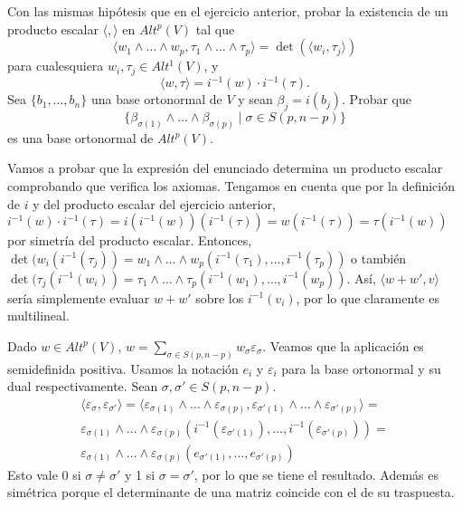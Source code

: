 \documentclass[twoside]{article}
\begin{document}
\begin{ejercicio}{2.5}
Con las mismas hipótesis que en el ejercicio anterior, probar la existencia de un producto escalar $\langle,\rangle$ en $Alt^p(V)$ tal que
$$\langle w_1\land\dots\land w_p,\tau_1\land\dots\land\tau_p\rangle=\det(\langle w_i,\tau_j\rangle)$$
para cualesquiera $w_i,\tau_j\in Alt^1(V)$, y 
$$\langle w,\tau\rangle=i^{-1}(w)\cdot i^{-1}(\tau).$$
Sea $\{b_1,\dots, b_n\}$ una base ortonormal de $V$ y sean $\beta_j=i(b_j)$. Probar que
$$\{\beta_{\sigma(1)}\land\dots\land\beta_{\sigma(p)}\mid \sigma\in S(p,n-p)\}$$
es una base ortonormal de $Alt^p(V)$.
\end{ejercicio}
\begin{solucion}
Vamos a probar que la expresión del enunciado determina un producto escalar comprobando que verifica los axiomas. Tengamos en cuenta que por la definición de $i$ y del producto escalar del ejercicio anterior, $i^{-1}(w)\cdot i^{-1}(\tau)=i(i^{-1}(w))(i^{-1}(\tau))=w(i^{-1}(\tau))=\tau(i^{-1}(w))$ por simetría del producto escalar. Entonces, $\det(w_i(i^{-1}(\tau_j))=w_1\land\dots\land w_p(i^{-1}(\tau_1),\dots, i^{-1}(\tau_p))$ o también $\det(\tau_j(i^{-1}(w_i))=\tau_1\land\dots\land\tau_p(i^{-1}(w_1),\dots, i^{-1}(w_p))$. Así, $\langle w+w',v\rangle$ sería simplemente evaluar $w+w'$ sobre los $i^{-1}(v_i)$, por lo que claramente es multilineal. 

Dado $w\in Alt^p(V)$, $w=\sum_{\sigma\in S(p,n-p)}w_{\sigma}\varepsilon_{\sigma}$. Veamos que la aplicación es semidefinida positiva. Usamos la notación $e_i$ y $\varepsilon_i$ para la base ortonormal y su dual respectivamente. Sean $\sigma,\sigma'\in S(p,n-p)$.
\begin{gather*}
\langle \varepsilon_{\sigma}, \varepsilon_{\sigma'}\rangle=\langle \varepsilon_{\sigma(1)}\land\dots\land\varepsilon_{\sigma(p)},\varepsilon_{\sigma'(1)}\land\dots\land\varepsilon_{\sigma'(p)}\rangle=\\
\varepsilon_{\sigma(1)}\land\dots\land\varepsilon_{\sigma(p)}(i^{-1}(\varepsilon_{\sigma'(1)}),\dots, i^{-1}(\varepsilon_{\sigma'(p)}))=\\
\varepsilon_{\sigma(1)}\land\dots\land\varepsilon_{\sigma(p)}(e_{\sigma'(1)}, \dots, e_{\sigma'(p)})
\end{gather*}
Esto vale 0 si $\sigma\neq\sigma'$ y 1 si $\sigma=\sigma'$, por lo que se tiene el resultado. 
Además es simétrica porque el determinante de una matriz coincide con el de su traspuesta.


\end{solucion}
\end{document}
